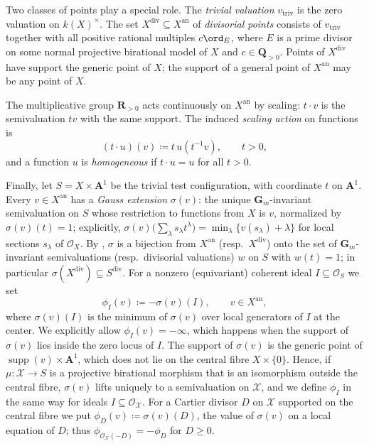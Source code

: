 \documentclass[11pt,a4paper]{article}
\newcommand{\an}{\mathrm{an}}          %
\newcommand{\divv}{\mathrm{div}}       %
\newcommand{\vtriv}{v_{\mathrm{triv}}} %
\begin{document}
Two classes of points play a special role.  The \emph{trivial valuation} $\vtriv$ is the zero valuation on $k(X)^\times$.  The set $X^{\divv}\subseteq X^{\an}$ of \emph{divisorial points} consists of $\vtriv$ together with all positive rational multiples $c\ord_E$, where $E$ is a prime divisor on some normal projective birational model of $X$ and $c\in\mathbf{Q}_{>0}$.  Points of $X^{\divv}$ have support the generic point of $X$; the support of a general point of $X^{\an}$ may be any point of $X$.

The multiplicative group $\mathbf{R}_{>0}$ acts continuously on $X^{\an}$ by scaling: $t\cdot v$ is the semivaluation $tv$ with the same support.  The induced \emph{scaling action} on functions is
\begin{equation}\label{eq:scaling-action}
  (t\mathbin\cdot u)(v)\coloneqq t\,u(t^{-1}v),\qquad t>0,
\end{equation}
and a function $u$ is \emph{homogeneous} if $t\mathbin\cdot u=u$ for all $t>0$.

Finally, let $S=X\times\mathbf{A}^1$ be the trivial test configuration, with coordinate $t$ on $\mathbf{A}^1$.  Every $v\in X^{\an}$ has a \emph{Gauss extension} $\sigma(v)$: the unique $\mathbf{G}_m$-invariant semivaluation on $S$ whose restriction to functions from $X$ is $v$, normalized by $\sigma(v)(t)=1$; explicitly, $\sigma(v)\bigl(\sum_\lambda s_\lambda t^\lambda\bigr) =\min_\lambda\{v(s_\lambda)+\lambda\}$ for local sections $s_\lambda$ of $\mathcal{O}_X$.  By \cite[\S1.3]{BJ22}, $\sigma$ is a bijection from $X^{\an}$ (resp.\ $X^{\divv}$) onto the set of $\mathbf{G}_m$-invariant semivaluations (resp.\ divisorial valuations) $w$ on $S$ with $w(t)=1$; in particular $\sigma(X^{\divv})\subseteq S^{\divv}$.  For a nonzero (equivariant) coherent ideal $I\subseteq\mathcal{O}_S$ we set
\[
  \phi_I(v)\coloneqq-\sigma(v)(I),
  \qquad v\in X^{\an},
\]
where $\sigma(v)(I)$ is the minimum of $\sigma(v)$ over local generators of $I$ at the center.  We explicitly allow $\phi_I(v)=-\infty$, which happens when the support of $\sigma(v)$ lies inside the zero locus of $I$. The support of $\sigma(v)$ is the generic point of $\operatorname{supp}(v)\times\mathbf A^1$, which does not lie on the central fibre $X\times\{0\}$. Hence, if $\mu\colon\mathcal X\to S$ is a projective birational morphism that is an isomorphism outside the central fibre, $\sigma(v)$ lifts uniquely to a semivaluation on $\mathcal X$, and we define $\phi_I$ in the same way for ideals $I\subseteq\mathcal O_{\mathcal X}$. For a Cartier divisor $D$ on $\mathcal X$ supported on the central fibre we put $\phi_D(v)\coloneqq\sigma(v)(D)$, the value of $\sigma(v)$ on a local equation of $D$; thus $\phi_{\mathcal O_{\mathcal X}(-D)}=-\phi_D$ for $D\geq0$.
\end{document}
